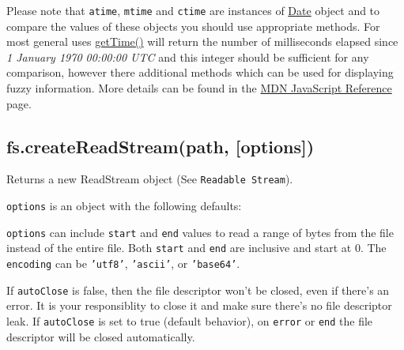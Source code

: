 Please note that \texttt{atime}, \texttt{mtime} and \texttt{ctime} are
instances of
\href{https://developer.mozilla.org/en/JavaScript/Reference/Global\_Objects/Date}{Date}
object and to compare the values of these objects you should use
appropriate methods. For most general uses
\href{https://developer.mozilla.org/en/JavaScript/Reference/Global\_Objects/Date/getTime}{getTime()}
will return the number of milliseconds elapsed since \emph{1 January
1970 00:00:00 UTC} and this integer should be sufficient for any
comparison, however there additional methods which can be used for
displaying fuzzy information. More details can be found in the
\href{https://developer.mozilla.org/en/JavaScript/Reference/Global\_Objects/Date}{MDN
JavaScript Reference} page.

\subsection{fs.createReadStream(path, {[}options{]})}

Returns a new ReadStream object (See \texttt{Readable Stream}).

\texttt{options} is an object with the following defaults:

\begin{Shaded}
\begin{Highlighting}[]
\NormalTok{\{ }\NormalTok{: }\NormalTok{,}
  \NormalTok{: }\NormalTok{,}
  \NormalTok{: } \NormalTok{* }\NormalTok{,}
  \NormalTok{: }
\NormalTok{\}}
\end{Highlighting}
\end{Shaded}

\texttt{options} can include \texttt{start} and \texttt{end} values to
read a range of bytes from the file instead of the entire file. Both
\texttt{start} and \texttt{end} are inclusive and start at 0. The
\texttt{encoding} can be \texttt{'utf8'}, \texttt{'ascii'}, or
\texttt{'base64'}.

If \texttt{autoClose} is false, then the file descriptor won't be
closed, even if there's an error. It is your responsiblity to close it
and make sure there's no file descriptor leak. If \texttt{autoClose} is
set to true (default behavior), on \texttt{error} or \texttt{end} the
file descriptor will be closed automatically.

